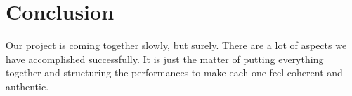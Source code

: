 \documentclass[onecolumn, draftclsnofoot,10pt, compsoc]{IEEEtran}
\begin{document}
\section{Conclusion}

Our project is coming together slowly, but surely. There are a lot of aspects we have accomplished successfully. It is just the matter of putting everything together and structuring the performances to make each one feel coherent and authentic.

\pagebreak


% 
% 
\end{document}
